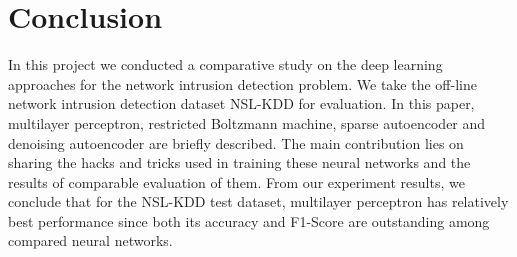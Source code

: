 \section{Conclusion}
In this project we conducted a comparative study on the deep learning approaches
for the network intrusion detection problem.
We take the off-line network intrusion detection dataset NSL-KDD for evaluation.
In this paper, multilayer perceptron, restricted Boltzmann machine, sparse autoencoder
and denoising autoencoder are briefly described.
The main contribution lies on sharing the hacks and tricks used in training these neural networks
and the results of comparable evaluation of them.
From our experiment results, we conclude that for the NSL-KDD test dataset,
multilayer perceptron has relatively best performance since both its accuracy and F1-Score
are outstanding among compared neural networks.
